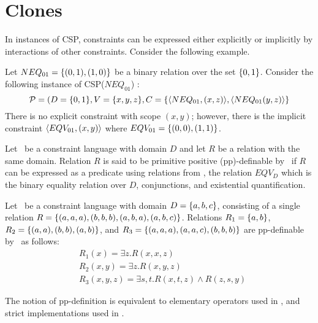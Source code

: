 \section{Clones}
In instances of CSP, constraints can be expressed either explicitly or implicitly by 
interactions of other constraints. Consider the following example.

\begin{example}
Let \(NEQ_{01}=\{{(0,1),(1,0)}\}\) be a binary relation over the set
\(\{{0,1}\}\)\@. Consider the following instance of 
CSP(\(NEQ_{01}\)) :
\[\mathcal{P}=(D=\{{0,1}\},V=\{{x,y,z}\},
 C=\{{\langle NEQ_{01},(x,z) \rangle,\langle NEQ_{01}(y,z) \rangle}\}\]
There is no explicit constraint with scope \((x,y)\)\@; however, there is the implicit 
constraint \(\langle EQV_{01},(x,y) \rangle\) where \(EQV_{01}=\{{(0,0),(1,1)}\}\)\@.
\end{example}

\begin{defi}[pp-definition]
Let \mrelset\ be a constraint language with domain \(D\) and 
let \(R\) be a relation with the same domain.
Relation \(R\) is said to be primitive positive (pp)-definable by \mrelset\
if \(R\) can be expressed as a predicate using relations from \mrelset,
the relation \(EQV_D\) which is the binary equality relation over \(D\),  conjunctions, and
existential quantification.
\end{defi}

\begin{example} \label{exm:ppd} 
Let \mrelset\ be a constraint language with domain \(D=\{{a,b,c}\}\), 
consisting of a single relation 
\(R=\{{(a,a,a),(b,b,b),(a,b,a),(a,b,c)}\}\)\@.
Relations 
\(R_1=\{{a,b}\}\), 
\(R_2=\{{(a,a),(b,b),(a,b)}\}\), 
and
\(R_3=\{{(a,a,a),(a,a,c),(b,b,b)}\}\) are pp-definable by \mrelset\ as follows:
\begin{align*}
&R_1(x)=\exists z.R(x,x,z)\\
&R_2(x,y)=\exists z.R(x,y,z)\\
&R_3(x,y,z)=\exists s,t.R(x,t,z)\land R(z,s,y)
\end{align*}
\end{example}

The notion of  pp-definition is equivalent to elementary operators used in \cite{post41,bkkr69,lau},
and strict implementations used in \cite{madu,Trichotomy}\@.


